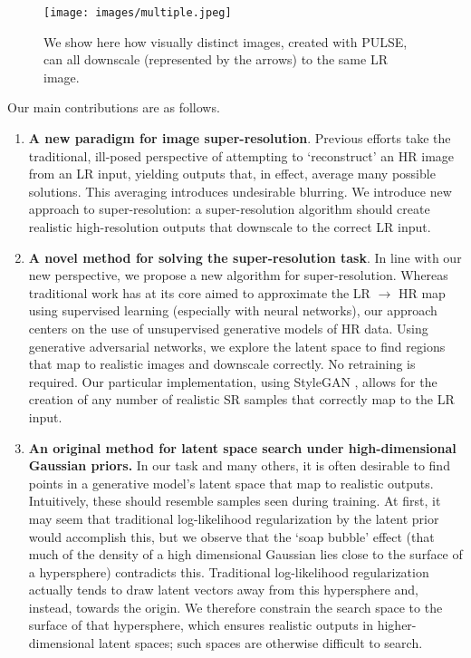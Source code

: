 \documentclass[10pt,twocolumn,letterpaper]{article}
\begin{document}
\begin{figure}[!t]
    \centering
    \texttt{[image: images/multiple.jpeg]}
    \caption{We show here how visually distinct images, created with PULSE, can all downscale (represented by the arrows) to the same LR image. }
    \label{fig:multipledownscale}
\end{figure}

Our main contributions are as follows.
\begin{enumerate}
    \item \textbf{A new paradigm for image super-resolution}. Previous efforts take the traditional, ill-posed perspective of attempting to `reconstruct' an HR image from an LR input, yielding outputs that, in effect, average many possible solutions. This averaging introduces undesirable blurring. We introduce new approach to super-resolution: a super-resolution algorithm should create realistic high-resolution outputs that downscale to the correct LR input.
    \item \textbf{A novel method for solving the super-resolution task}. In line with our new perspective, we propose a new algorithm for super-resolution. Whereas traditional work has at its core aimed to approximate the LR $\rightarrow$ HR map using supervised learning (especially with neural networks), our approach centers on the use of unsupervised generative models of HR data. Using generative adversarial networks, we explore the latent space to find regions that map to realistic images and downscale correctly. No retraining is required. Our particular implementation, using StyleGAN \cite{karras2019style}, allows for the creation of any number of realistic SR samples that correctly map to the LR input.
    \item \textbf{An original method for latent space search under high-dimensional Gaussian priors.} In our task and many others, it is often desirable to find points in a generative model's latent space that map to realistic outputs. Intuitively, these should resemble samples seen during training. At first, it may seem that traditional log-likelihood regularization by the latent prior would accomplish this, but we observe that the `soap bubble' effect (that much of the density of a high dimensional Gaussian lies close to the surface of a hypersphere) contradicts this. Traditional log-likelihood regularization actually tends to draw latent vectors away from this hypersphere and, instead, towards the origin. We therefore constrain the search space to the surface of that hypersphere, which ensures realistic outputs in higher-dimensional latent spaces; such spaces are otherwise difficult to search.
    
    
\end{enumerate}
\end{document}
